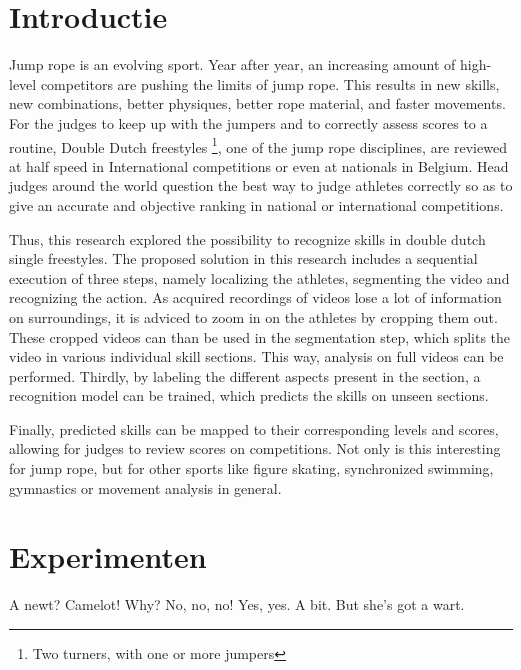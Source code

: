 \documentclass[english,a0,portrait]{hogent-poster}
\begin{document}
\begin{multicols}{2} %

\section{Introductie}

Jump rope is an evolving sport.
Year after year, an increasing amount of high-level competitors are pushing the limits of jump rope.
This results in new skills, new combinations, better physiques, better rope material, and faster movements. For the judges to keep up with the jumpers and to correctly assess scores to a routine, Double Dutch freestyles \footnote{Two turners, with one or more jumpers}, one of the jump rope disciplines, are reviewed at half speed in International competitions or even at nationals in Belgium.
Head judges around the world question the best way to judge athletes correctly so as to give an accurate and objective ranking in national or international competitions.

Thus, this research explored the possibility to recognize skills in double dutch single freestyles. 
The proposed solution in this research includes a sequential execution of three steps, namely localizing the athletes, segmenting the video and recognizing the action. 
As acquired recordings of videos lose a lot of information on surroundings, it is adviced to zoom in on the athletes by cropping them out. These cropped videos can than be used in the segmentation step, which splits the video in various individual skill sections. This way, analysis on full videos can be performed. Thirdly, by labeling the different aspects present in the section, a recognition model can be trained, which predicts the skills on unseen sections. 

Finally, predicted skills can be mapped to their corresponding levels and scores, allowing for judges to review scores on competitions. Not only is this interesting for jump rope, but for other sports like figure skating, synchronized swimming, gymnastics or movement analysis in general.

\section{Experimenten}

A newt? Camelot! Why? No, no, no! Yes, yes. A bit. But she's got a wart.


\end{multicols}
\end{document}

